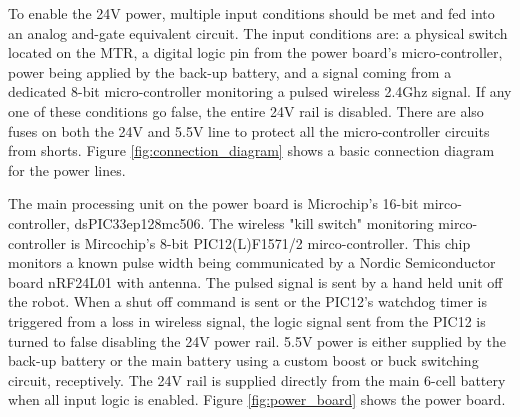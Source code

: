 To enable the 24V power, multiple input conditions should be met and fed into an analog and-gate equivalent circuit.
The input conditions are: a physical switch located on the MTR, a digital logic pin from the power board's micro-controller, power being applied by the back-up battery, and a signal coming from a dedicated 8-bit micro-controller monitoring a pulsed wireless 2.4Ghz signal.
If any one of these conditions go false, the entire 24V rail is disabled.
There are also fuses on both the 24V and 5.5V line to protect all the micro-controller circuits from shorts.
Figure \ref{fig:connection_diagram} shows a basic connection diagram for the power lines.

The main processing unit on the power board is Microchip's 16-bit mirco-controller, dsPIC33ep128mc506. %
The wireless "kill switch" monitoring mirco-controller is Mircochip's 8-bit PIC12(L)F1571/2 mirco-controller.
This chip monitors a known pulse width being communicated by a Nordic Semiconductor board nRF24L01 with antenna.
The pulsed signal is sent by a hand held unit off the robot.
When a shut off command is sent or the PIC12's watchdog timer is triggered from a loss in wireless signal, the logic signal sent from the PIC12 is turned to false disabling the 24V power rail. 
5.5V power is either supplied by the back-up battery or the main battery using a custom boost or buck switching circuit, receptively.
The 24V rail is supplied directly from the main 6-cell battery when all input logic is enabled.
Figure \ref{fig:power_board} shows the power board. 


